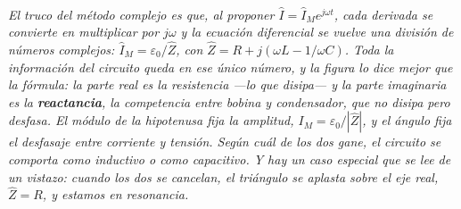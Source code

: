 \begin{center}
\begin{tikzpicture}[scale=1]
\end{tikzpicture}\\[0.5em]
{\small\itshape El truco del método complejo es que, al proponer
$\hat I = \hat I_M e^{j\omega t}$, cada derivada se convierte en multiplicar por
$j\omega$ y la ecuación diferencial se vuelve una división de números
complejos: $\hat I_M = \varepsilon_0/\hat Z$, con
$\hat Z = R + j(\omega L - 1/\omega C)$. Toda la información del circuito queda
en ese único número, y la figura lo dice mejor que la fórmula: la parte real es
la resistencia ---lo que disipa--- y la parte imaginaria es la
\textbf{reactancia}, la competencia entre bobina y condensador, que no disipa
pero desfasa. El módulo de la hipotenusa fija la amplitud,
$I_M = \varepsilon_0/|\hat Z|$, y el ángulo fija el desfasaje entre corriente y
tensión. Según cuál de los dos gane, el circuito se comporta como inductivo o
como capacitivo. Y hay un caso especial que se lee de un vistazo: cuando los dos
se cancelan, el triángulo se aplasta sobre el eje real, $\hat Z = R$, y estamos
en resonancia.}
\end{center}
